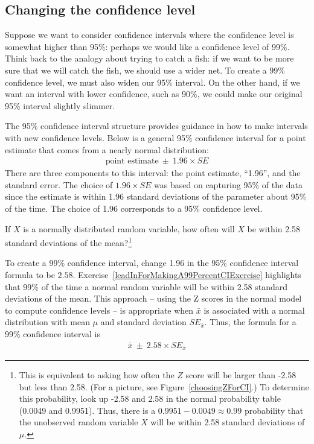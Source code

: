 \subsection{Changing the confidence level}
\label{changingTheConfidenceLevelSection}


Suppose we want to consider confidence intervals where the confidence level is somewhat higher than 95\%: perhaps we would like a confidence level of 99\%. Think back to the analogy about trying to catch a fish: if we want to be more sure that we will catch the fish, we should use a wider net. To create a 99\% confidence level, we must also widen our 95\% interval. On the other hand, if we want an interval with lower confidence, such as 90\%, we could make our original 95\% interval slightly slimmer.

The 95\% confidence interval structure provides guidance in how to make intervals with new confidence levels. Below is a general 95\% confidence interval for a point estimate that comes from a nearly normal distribution:
\begin{eqnarray}
\text{point estimate}\ \pm\ 1.96\times SE
\end{eqnarray}
There are three components to this interval: the point estimate, ``1.96'', and the standard error. The choice of $1.96\times SE$ was based on capturing 95\% of the data since the estimate is within 1.96 standard deviations of the parameter about 95\% of the time. The choice of 1.96 corresponds to a 95\% confidence level. 

\begin{exercise} \label{leadInForMakingA99PercentCIExercise}
If $X$ is a normally distributed random variable, how often will $X$ be within 2.58 standard deviations of the mean?\footnote{This is equivalent to asking how often the $Z$ score will be larger than -2.58 but less than 2.58. (For a picture, see Figure~\ref{choosingZForCI}.) To determine this probability, look up -2.58 and 2.58 in the normal probability table (0.0049 and 0.9951). Thus, there is a $0.9951-0.0049 \approx 0.99$ probability that the unobserved random variable $X$ will be within 2.58 standard deviations of $\mu$.}
\end{exercise}

To create a 99\% confidence interval, change 1.96 in the 95\% confidence interval formula to be $2.58$. Exercise~\ref{leadInForMakingA99PercentCIExercise} highlights that 99\% of the time a normal random variable will be within 2.58 standard deviations of the mean. This approach -- using the Z scores in the normal model to compute confidence levels -- is appropriate when $\bar{x}$ is associated with a normal distribution with mean $\mu$ and standard deviation $SE_{\bar{x}}$. Thus, the formula for a 99\% confidence interval is
\begin{eqnarray}
\bar{x}\ \pm\ 2.58\times SE_{\bar{x}}
\label{99PercCIForMean}
\end{eqnarray}

